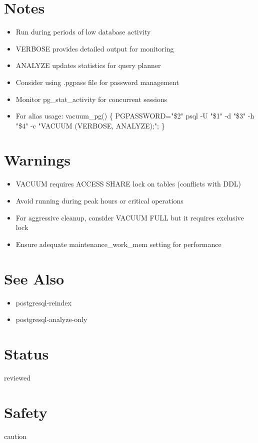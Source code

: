 \documentclass[openany]{book}
\begin{document}
\section*{Notes}
\begin{itemize}
  \item Run during periods of low database activity
  \item VERBOSE provides detailed output for monitoring
  \item ANALYZE updates statistics for query planner
  \item Consider using .pgpass file for password management
  \item Monitor pg\_stat\_activity for concurrent sessions
  \item For alias usage: vacuum\_pg() \{ PGPASSWORD="\$2" psql -U "\$1" -d "\$3" -h "\$4" -c "VACUUM (VERBOSE, ANALYZE);"; \}
\end{itemize}

\section*{Warnings}
\begin{itemize}
  \item VACUUM requires ACCESS SHARE lock on tables (conflicts with DDL)
  \item Avoid running during peak hours or critical operations
  \item For aggressive cleanup, consider VACUUM FULL but it requires exclusive lock
  \item Ensure adequate maintenance\_work\_mem setting for performance
\end{itemize}

\section*{See Also}
\begin{itemize}
  \item postgresql-reindex
  \item postgresql-analyze-only
\end{itemize}

\section*{Status}
reviewed

\section*{Safety}
caution
\end{document}
